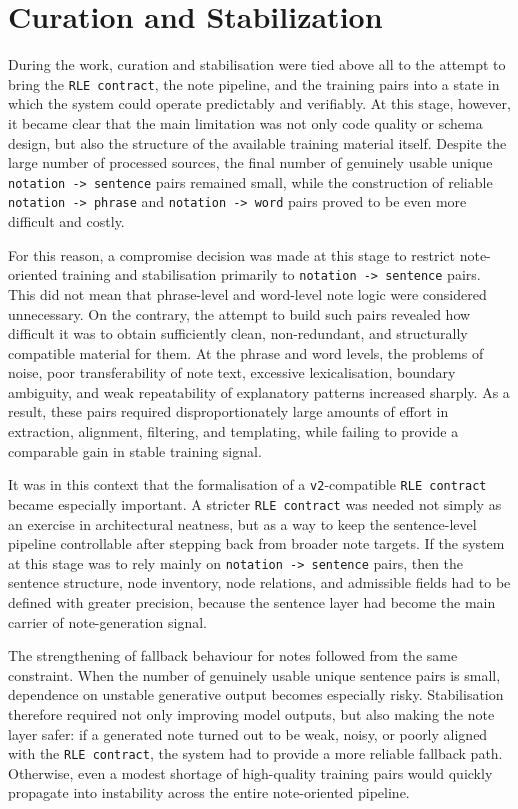 \documentclass[12pt,a4paper,oneside]{report}
\begin{document}
\section{Curation and Stabilization}
During the work, curation and stabilisation were tied above all to the attempt to bring the \texttt{RLE contract}, the note pipeline, and the training pairs into a state in which the system could operate predictably and verifiably. At this stage, however, it became clear that the main limitation was not only code quality or schema design, but also the structure of the available training material itself. Despite the large number of processed sources, the final number of genuinely usable unique \texttt{notation -> sentence} pairs remained small, while the construction of reliable \texttt{notation -> phrase} and \texttt{notation -> word} pairs proved to be even more difficult and costly.

For this reason, a compromise decision was made at this stage to restrict note-oriented training and stabilisation primarily to \texttt{notation -> sentence} pairs. This did not mean that phrase-level and word-level note logic were considered unnecessary. On the contrary, the attempt to build such pairs revealed how difficult it was to obtain sufficiently clean, non-redundant, and structurally compatible material for them. At the phrase and word levels, the problems of noise, poor transferability of note text, excessive lexicalisation, boundary ambiguity, and weak repeatability of explanatory patterns increased sharply. As a result, these pairs required disproportionately large amounts of effort in extraction, alignment, filtering, and templating, while failing to provide a comparable gain in stable training signal.

It was in this context that the formalisation of a \texttt{v2}-compatible \texttt{RLE contract} became especially important. A stricter \texttt{RLE contract} was needed not simply as an exercise in architectural neatness, but as a way to keep the sentence-level pipeline controllable after stepping back from broader note targets. If the system at this stage was to rely mainly on \texttt{notation -> sentence} pairs, then the sentence structure, node inventory, node relations, and admissible fields had to be defined with greater precision, because the sentence layer had become the main carrier of note-generation signal.

The strengthening of fallback behaviour for notes followed from the same constraint. When the number of genuinely usable unique sentence pairs is small, dependence on unstable generative output becomes especially risky. Stabilisation therefore required not only improving model outputs, but also making the note layer safer: if a generated note turned out to be weak, noisy, or poorly aligned with the \texttt{RLE contract}, the system had to provide a more reliable fallback path. Otherwise, even a modest shortage of high-quality training pairs would quickly propagate into instability across the entire note-oriented pipeline.
\end{document}
